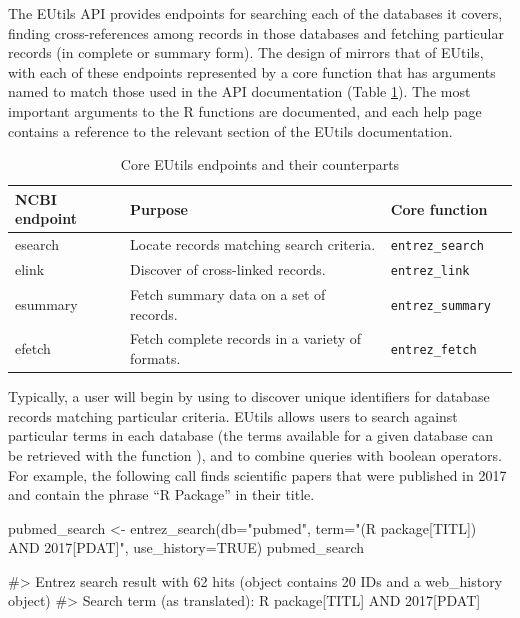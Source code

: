 The EUtils API provides endpoints for searching each of the databases it covers, 
finding cross-references among records in those databases and fetching 
particular records (in complete or summary form). The design of  
mirrors that of EUtils, with each of these endpoints represented by a core
function that has arguments named to match those used in the API documentation
(Table \ref{tab:core-ends}). The most important arguments to the R functions are
documented, and each help page contains a reference to the relevant section of 
the EUtils documentation.

\begin{table}[]
\centering
\caption{Core EUtils endpoints and their  counterparts}
\label{tab:core-ends}
\begin{tabular}{llll}
\hline
NCBI endpoint & Purpose                                         & Core function            \\ \hline
esearch       & Locate records matching search criteria.        & \texttt{entrez\_search}  \\
elink         & Discover of cross-linked records.               & \texttt{entrez\_link}    \\ 
esummary      & Fetch summary data on a set of records.         & \texttt{entrez\_summary} \\ 
efetch        & Fetch complete records in a variety of formats. & \texttt{entrez\_fetch}   \\ \hline
\end{tabular}
\end{table}


Typically, a user will begin by using  to discover unique
identifiers for database records matching particular criteria. EUtils allows
users to search against particular terms in each database (the terms available
for a given database can be retrieved with the function
), and to combine queries with boolean operators. 
For example, the following call finds scientific papers that were published in 2017 
and contain the phrase ``R Package'' in their title.

\begin{example}
pubmed_search <- entrez_search(db="pubmed", 
                               term="(R package[TITL]) AND 2017[PDAT]", 
                               use_history=TRUE)
pubmed_search

#> Entrez search result with 62 hits (object contains 20 IDs and a web_history object)
#>  Search term (as translated):  R package[TITL] AND 2017[PDAT]
\end{example}

